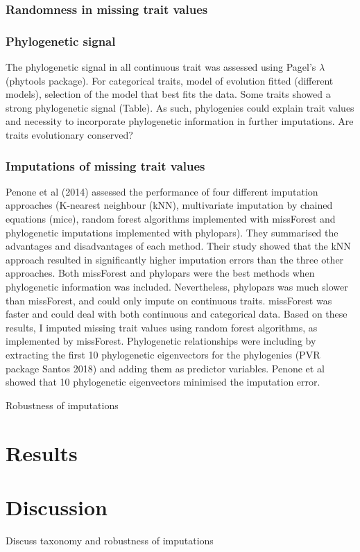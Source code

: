 \subsubsection{Randomness in missing trait values}

\subsubsection{Phylogenetic signal}
The phylogenetic signal in all continuous trait was assessed using Pagel's $\lambda$ (phytools package). 
For categorical traits, model of evolution fitted (different models), selection of the model that best fits the data.
Some traits showed a strong phylogenetic signal (Table). As such, phylogenies could explain trait values and necessity to incorporate phylogenetic information in further imputations. Are traits evolutionary conserved?



\subsubsection{Imputations of missing trait values}
Penone et al (2014) assessed the performance of four different imputation approaches (K-nearest neighbour (kNN), multivariate imputation by chained equations (mice), random forest algorithms implemented with missForest and phylogenetic imputations implemented with phylopars). They summarised the advantages and disadvantages of each method. Their study showed that the kNN approach resulted in significantly higher imputation errors than the three other approaches. Both missForest and phylopars were the best methods when phylogenetic information was included. Nevertheless, phylopars was much slower than missForest, and could only impute on continuous traits. missForest was faster and could deal with both continuous and categorical data.
Based on these results, I imputed missing trait values using random forest algorithms, as implemented by missForest. Phylogenetic relationships were including by extracting the first 10 phylogenetic eigenvectors for the phylogenies (PVR package Santos 2018) and adding them as predictor variables. Penone et al showed that 10 phylogenetic eigenvectors minimised the imputation error. 



Robustness of imputations

\section{Results}


\section{Discussion}
Discuss taxonomy and robustness of imputations

